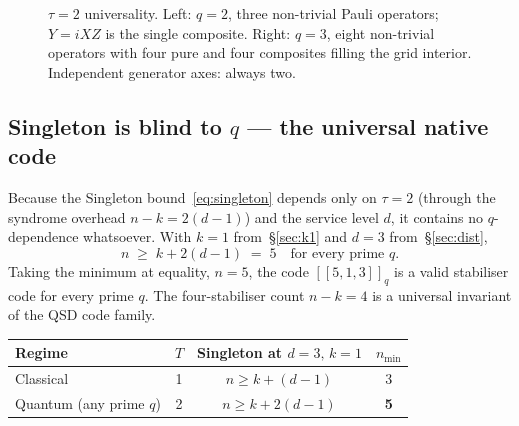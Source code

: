 \documentclass[11pt,a4paper]{article}
\newcommand{\Cq}[4]{[\![#1,#2,#3]\!]_{#4}}
\begin{document}
\begin{figure}[h]
\caption{$\tau=2$ universality. Left: $q=2$, three non-trivial Pauli
operators; $Y=iXZ$ is the single composite. Right: $q=3$, eight
non-trivial operators with four pure and four composites filling the
grid interior. Independent generator axes: always two.}
\label{fig:T2}
\end{figure}

\subsection{Singleton is blind to $q$ --- the universal native code}
\label{sec:singleton_blind}

Because the Singleton bound~\eqref{eq:singleton} depends only on $\tau=2$ (through the syndrome overhead $n-k=2(d-1)$) and the service level $d$, it contains no $q$-dependence whatsoever. With $k=1$ from~\S\ref{sec:k1} and $d=3$ from~\S\ref{sec:dist},
\begin{equation}
  n \;\geq\; k + 2(d-1) \;=\; 5
  \quad \text{for every prime } q.
  \label{eq:n_5_universal}
\end{equation}
Taking the minimum at equality, $n=5$, the code $\Cq{5}{1}{3}{q}$ is a valid stabiliser code for every prime $q$. The four-stabiliser count $n-k=4$ is a universal invariant of the QSD code family.

\begin{center}
\renewcommand{\arraystretch}{1.25}
\begin{tabular}{lccc}
\toprule
Regime & $T$ & Singleton at $d=3,\,k=1$ & $n_{\min}$ \\
\midrule
Classical & 1 & $n\geq k+(d-1)$ & 3 \\
Quantum (any prime $q$) & 2 & $n\geq k+2(d-1)$ & \textbf{5} \\
\bottomrule
\end{tabular}
\end{center}
\end{document}

